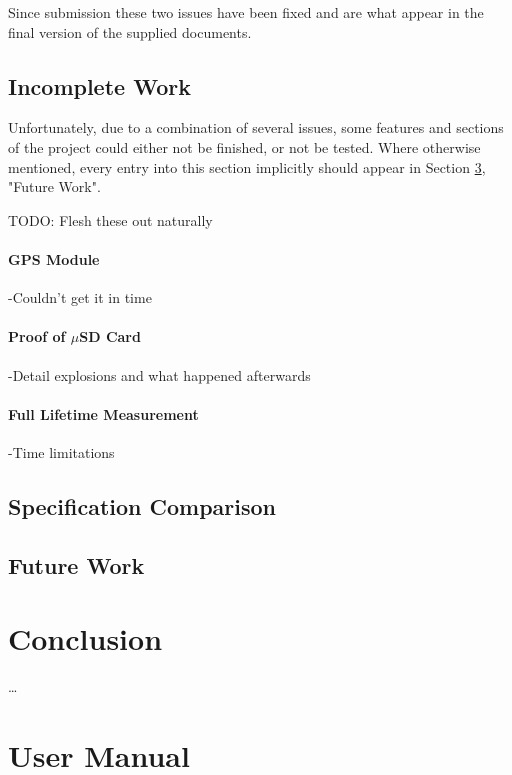 \documentclass[12pt,openany,a4paper]{book}
\begin{document}
		Since submission these two issues have been fixed and are what appear in the final version of the supplied documents. \\
		
	\section{Incomplete Work}
	Unfortunately, due to a combination of several issues, some features and sections of the project could either not be finished, or not be tested. Where otherwise mentioned, every entry into this section implicitly  should appear in Section \ref{sec:FUTURE}, "Future Work".
	
	TODO: Flesh these out naturally
	\subsubsection{GPS Module}
		-Couldn't get it in time\\
	\subsubsection{Proof of $\mu$SD Card}
		-Detail explosions and what happened afterwards\\
	\subsubsection{Full Lifetime Measurement}
		-Time limitations\\
	
	\section{Specification Comparison}
	\section{Future Work} \label{sec:FUTURE}

\chapter{Conclusion}

\ldots 

\chapter{User Manual}
\end{document}
